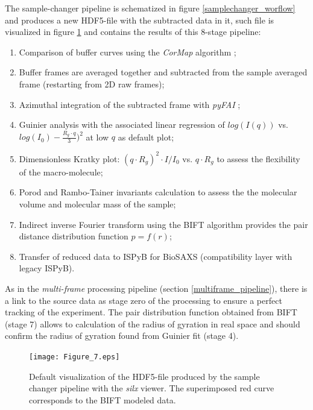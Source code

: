\documentclass[preprint]{iucr}              %
\begin{document}
The sample-changer pipeline is schematized in figure \ref{samplechanger_worflow} and produces a new HDF5-file with the subtracted data in it, such file is visualized in figure \ref{subtracted} and contains the results of this 8-stage pipeline: 
\begin{enumerate}
    \item Comparison of buffer curves using the \textit{CorMap} algorithm \cite{CorMap};
    \item Buffer frames are averaged together and subtracted from the sample averaged frame (restarting from 2D raw frames);
    \item Azimuthal integration of the subtracted frame with \textit{pyFAI} \cite{pyfai_2020};
    \item Guinier analysis with the associated linear regression of $log(I(q))$ vs. $log(I_0)-\frac{R_{g}\cdot q}{3})^{2}$ at low $q$ as default plot;
    \item Dimensionless Kratky plot: $(q\cdot R_g)^2\cdot I/I_0$  vs. $q\cdot R_g$ to assess the flexibility of the macro-molecule;
    \item Porod \cite{glatter+kratky} and Rambo-Tainer invariants \cite{RamboTainerNature2013} calculation to assess the the molecular volume and molecular mass of the sample;
    \item Indirect inverse Fourier transform using the BIFT algorithm \cite{bift} provides the pair distance distribution function $p=f(r)$;
    \item Transfer of reduced data to ISPyB for BioSAXS (compatibility layer with legacy ISPyB).
\end{enumerate}
As in the \textit{multi-frame} processing pipeline (section \ref{multiframe_pipeline}), there is a link to the source data as stage zero of the processing to ensure a perfect tracking of the experiment.
The pair distribution function obtained from BIFT (stage 7) allows to calculation of the radius of gyration in real space and should confirm the radius of gyration found from Guinier fit (stage 4). 

\begin{figure}
    \label{subtracted}
    \texttt{[image: Figure\_7.eps]}
    \caption{Default visualization of the HDF5-file produced by the sample changer pipeline with the \textit{silx} viewer. 
    The superimposed red curve corresponds to the BIFT modeled data.}
\end{figure}
\end{document}
